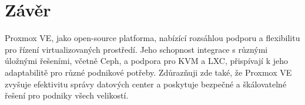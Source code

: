 \chapter{Závěr}
Proxmox VE, jako open-source platforma, nabízící rozsáhlou podporu a flexibilitu pro řízení virtualizovaných prostředí. Jeho schopnost integrace s různými úložnými řešeními, včetně Ceph, a podpora pro KVM a LXC, přispívají k jeho adaptabilitě pro různé podnikové potřeby. Zdůrazňuji zde také, že Proxmox VE zvyšuje efektivitu správy datových center a poskytuje bezpečné a škálovatelné řešení pro podniky všech velikostí.